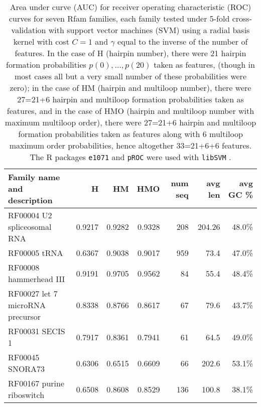 \begin{table*}
\begin{tabular}{|l|rrrrrr|}
\hline
Family name and description & H & HM & HMO & num seq& avg len & avg GC \% \\
\hline
RF00004 U2 spliceosomal RNA & 0.9217  & 0.9282  & 0.9328  & 208 & 204.26 &48.0\% \\
RF00005 tRNA &  0.6367  & 0.9038  & 0.9017  & 959 & 73.4& 47.0\%\\
RF00008 hammerhead III &  0.9191  & 0.9705  & 0.9562  & 84 & 55.4 & 48.4\% \\
RF00027 let 7 microRNA precursor &  0.8338  & 0.8766  & 0.8617  & 67 & 79.6 & 43.7\% \\
RF00031 SECIS 1 & 0.7917  & 0.8361  & 0.7941  & 61 & 64.5 & 49.0\% \\
RF00045 SNORA73 & 0.6306  & 0.6515  & 0.6609  & 66 & 202.6 & 53.1\% \\
RF00167 purine riboswitch & 0.6508  & 0.8608  & 0.8529  & 136 & 100.8 & 38.1\% \\
\hline
\end{tabular}
\caption{Area under curve (AUC) for receiver operating characteristic
(ROC) curves for
seven Rfam families, each family tested under 5-fold cross-validation with
support vector machines (SVM) using a radial basis kernel with
cost $C=1$ and $\gamma$ equal to the inverse of the number of features.
In the case of H (hairpin number), there were 21 hairpin formation
probabilities $p(0),\ldots,p(20)$ taken as features,
(though in
most cases all but a very small number of these probabilities were zero);
in the case  of HM (hairpin and multiloop number), there were
27=21+6 hairpin and multiloop formation probabilities taken as
features, and in the case  of HMO
(hairpin and multiloop number with maximum multiloop order), there were
27=21+6 hairpin and multiloop formation probabilities taken as features
along with 6 multiloop maximum order probabilities, hence altogether
33=21+6+6 features.
The R packages {\tt e1071} \cite{RpackageForSVM} and {\tt pROC} \cite{pROC}
were used with {\tt libSVM} \cite{libSVM}.
}
\label{table:AUC}
\end{table*}


